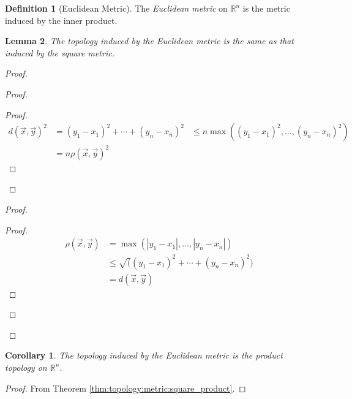 \documentclass{book}
\newtheorem{lm}{Lemma}[chapter]
\newtheorem{cor}{Corollary}[lm]
\theoremstyle{definition}
\newtheorem{df}[lm]{Definition}
\begin{document}
\begin{df}[Euclidean Metric]
The \emph{Euclidean metric} on $\mathbb{R}^n$ is the metric induced by the 
inner product.
\end{df}

\begin{lm}
The topology induced by the Euclidean metric is the same as that induced by 
the square metric.
\end{lm}

\begin{proof}
  \begin{proof}
    \begin{proof}
      \pf\ \begin{align*}
            d(\vec{x}, \vec{y})^2 & = (y_1 - x_1)^2 + \cdots + (y_n - x_n)^2
            & \leq n \max((y_1 - x_1)^2, \ldots, (y_n - x_n)^2) \\
            & = n \rho(\vec{x}, \vec{y})^2
          \end{align*}
    \end{proof}
  \end{proof}
  \begin{proof}
    \begin{proof}
      \pf\ \begin{align*}
            \rho(\vec{x}, \vec{y})
            & = \max(|y_1 - x_1|, \ldots, |y_n - x_n|) \\
            & \leq \sqrt((y_1 - x_1)^2 + \cdots + (y_n - x_n)^2) \\
            & = d(\vec{x}, \vec{y})
          \end{align*}
    \end{proof}
  \end{proof}
\end{proof}

\begin{cor}
The topology induced by the Euclidean metric is the product topology on 
$\mathbb{R}^n$.
\end{cor}

\begin{proof}
From Theorem \ref{thm:topology:metric:square_product}.
\end{proof}
\end{document}

